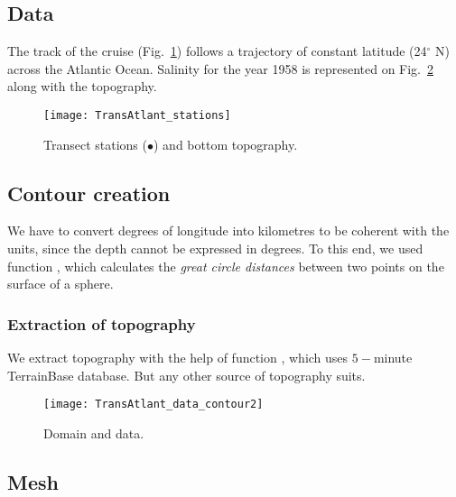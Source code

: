 \subsection{Data}

The track of the cruise (Fig.~\ref{fig:transectprofiles}) follows a trajectory of constant latitude (24$^{\circ}$ N) across the Atlantic Ocean. Salinity for the year 1958 is represented on Fig.~\ref{fig:domaindata} along with the topography. 

\begin{figure}[htpb]
\centering
\texttt{[image: TransAtlant\_stations]}
\caption{Transect stations ($\bullet$) and bottom topography.\label{fig:transectprofiles}}
\end{figure}

\subsection{Contour creation}

We have to convert degrees of longitude into kilometres to be coherent with the units, since the depth cannot be expressed in degrees. To this end, we used \matlab function , which calculates the \textit{great circle distances} between two points on the surface of a sphere.  

\subsubsection{Extraction of topography}

We extract topography with the help of \matlab function  , which uses $5-$minute TerrainBase database. But any other source of topography suits.
				
\begin{figure}[H]
\centering
\texttt{[image: TransAtlant\_data\_contour2]}
\caption{Domain and data.\label{fig:domaindata}}
\end{figure}


%
%

\subsection{Mesh} 

